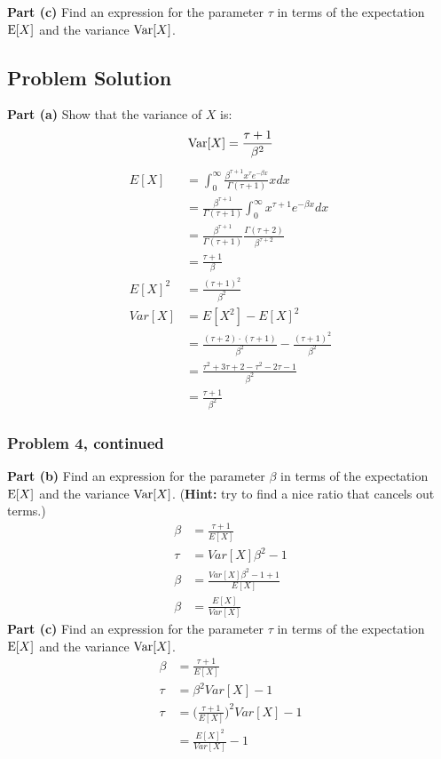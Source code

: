 \documentclass[12pt]{article}
\theoremstyle{definition}
\begin{document}
\bigskip
\noindent
{\bf Part (c)} Find an expression for the parameter $\tau$ in terms of the expectation $\hbox{E}[X]$ and the variance $\hbox{Var}[X]$.


\subsection*{Problem Solution}

\noindent
{\bf Part (a)} Show that the variance of $X$ is:
$$
\hbox{Var}[X] = \frac{\tau + 1}{\beta^2}
$$
\begin{align*}
E[X] &= \int_0^\infty \frac{\beta^{\tau + 1}x^\tau e^{-\beta x}}{\Gamma(\tau + 1)}xdx\\
&= \frac{\beta^{\tau + 1}}{\Gamma(\tau + 1)} \int_0^\infty x^{\tau + 1}e^{-\beta x} dx\\
&= \frac{\beta^{\tau + 1}}{\Gamma(\tau + 1)} \frac{\Gamma(\tau + 2)}{\beta^{\tau + 2}}\\
&= \frac{\tau + 1}{\beta}\\
E[X]^2 &= \frac{(\tau + 1)^2}{\beta^2}\\
Var[X] &= E[X^2] - E[X]^2\\
&= \frac{(\tau + 2) \cdot (\tau + 1)}{\beta^2} - \frac{(\tau + 1)^2}{\beta^2}\\
&= \frac{\tau^2 + 3\tau + 2 - \tau^2 - 2\tau - 1}{\beta^2}\\
&= \frac{\tau + 1}{\beta^2}
\end{align*}
\newpage
\subsubsection*{Problem 4, continued}

\noindent
{\bf Part (b)} Find an expression for the parameter $\beta$ in terms of the expectation $\hbox{E}[X]$ and the variance $\hbox{Var}[X]$. ({\bf Hint:} try to find a nice ratio that cancels out terms.)
\begin{align*}
\beta &= \frac{\tau + 1}{E[X]}\\
\tau &= Var[X]\beta^2 - 1\\
\beta &= \frac{Var[X]\beta^2 - 1 + 1}{E[X]}\\
\beta &= \frac{E[X]}{Var[X]}
\end{align*}
\noindent
{\bf Part (c)} Find an expression for the parameter $\tau$ in terms of the expectation $\hbox{E}[X]$ and the variance $\hbox{Var}[X]$.
\begin{align*}
\beta &= \frac{\tau + 1}{E[X]}\\
\tau &= \beta^2 Var[X] - 1\\
\tau &= \biggr(\frac{\tau + 1}{E[X]}\biggr)^2 Var[X] - 1\\
&= \frac{E[X]^2}{Var[X]} - 1
\end{align*}
\end{document}
